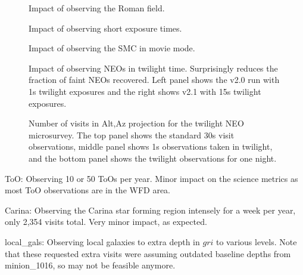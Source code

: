 \begin{figure}
\caption{Impact of observing the Roman field.  \label{fig:roman}}
\end{figure}


\begin{figure}
\caption{Impact of observing short exposure times.  \label{fig:short_exp}}
\end{figure}

\begin{figure}
\caption{Impact of observing the SMC in movie mode.  \label{fig:smc}}
\end{figure}


\begin{figure}
\caption{Impact of observing NEOs in twilight time. Surprisingly reduces the fraction of faint NEOs recovered. Left panel shows the v2.0 run with 1s twilight exposures and the right shows v2.1 with 15s twilight exposures. \label{fig:twilight}}
\end{figure}

\begin{figure}
\caption{Number of visits in Alt,Az projection for the twilight NEO microsurvey. The top panel shows the standard 30s visit observations, middle panel shows 1s observations taken in twilight, and the bottom panel shows the twilight observations for one night. \label{fig:twi_maps}}
\end{figure}


ToO: Observing 10 or 50 ToOs per year. Minor impact on the science metrics as most ToO observations are in the WFD area.


Carina:  Observing the Carina star forming region intensely for a week per year, only 2,354 visits total.  Very minor impact, as expected.


local\_gals:  Observing local galaxies to extra depth in $gri$ to various levels. Note that these requested extra visits were assuming outdated baseline depths from minion\_1016, so may not be feasible anymore.

